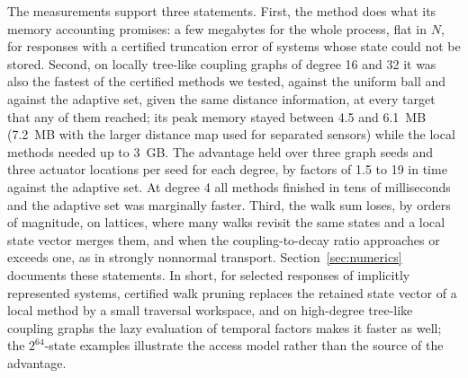 The measurements support three statements. First, the method does what its memory accounting promises: a few megabytes for the whole process, flat in $N$, for responses with a certified truncation error of systems whose state could not be stored. Second, on locally tree-like coupling graphs of degree 16 and 32 it was also the fastest of the certified methods we tested, against the uniform ball and against the adaptive set, given the same distance information, at every target that any of them reached; its peak memory stayed between 4.5 and 6.1~MB (7.2~MB with the larger distance map used for separated sensors) while the local methods needed up to 3~GB. The advantage held over three graph seeds and three actuator locations per seed for each degree, by factors of 1.5 to 19 in time against the adaptive set. At degree 4 all methods finished in tens of milliseconds and the adaptive set was marginally faster. Third, the walk sum loses, by orders of magnitude, on lattices, where many walks revisit the same states and a local state vector merges them, and when the coupling-to-decay ratio approaches or exceeds one, as in strongly nonnormal transport. Section~\ref{sec:numerics} documents these statements. In short, for selected responses of implicitly represented systems, certified walk pruning replaces the retained state vector of a local method by a small traversal workspace, and on high-degree tree-like coupling graphs the lazy evaluation of temporal factors makes it faster as well; the $2^{64}$-state examples illustrate the access model rather than the source of the advantage.
